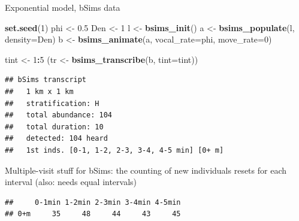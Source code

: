 \documentclass[12pt,]{book}
\newenvironment{Shaded}{\begin{snugshade}}{\end{snugshade}}
\newcommand{\DataTypeTok}[1]{\textcolor[rgb]{0.13,0.29,0.53}{#1}}
\newcommand{\DecValTok}[1]{\textcolor[rgb]{0.00,0.00,0.81}{#1}}
\newcommand{\FloatTok}[1]{\textcolor[rgb]{0.00,0.00,0.81}{#1}}
\newcommand{\KeywordTok}[1]{\textcolor[rgb]{0.13,0.29,0.53}{\textbf{#1}}}
\newcommand{\NormalTok}[1]{#1}
\newcommand{\OperatorTok}[1]{\textcolor[rgb]{0.81,0.36,0.00}{\textbf{#1}}}
\newcommand{\StringTok}[1]{\textcolor[rgb]{0.31,0.60,0.02}{#1}}
\begin{document}
Exponential model, bSims data

\begin{Shaded}
\begin{Highlighting}[]
\KeywordTok{set.seed}\NormalTok{(}\DecValTok{1}\NormalTok{)}
\NormalTok{phi <-}\StringTok{ }\FloatTok{0.5}
\NormalTok{Den <-}\StringTok{ }\DecValTok{1}
\NormalTok{l <-}\StringTok{ }\KeywordTok{bsims_init}\NormalTok{()}
\NormalTok{a <-}\StringTok{ }\KeywordTok{bsims_populate}\NormalTok{(l, }\DataTypeTok{density=}\NormalTok{Den)}
\NormalTok{b <-}\StringTok{ }\KeywordTok{bsims_animate}\NormalTok{(a, }\DataTypeTok{vocal_rate=}\NormalTok{phi, }\DataTypeTok{move_rate=}\DecValTok{0}\NormalTok{)}

\NormalTok{tint <-}\StringTok{ }\DecValTok{1}\OperatorTok{:}\DecValTok{5}
\NormalTok{(tr <-}\StringTok{ }\KeywordTok{bsims_transcribe}\NormalTok{(b, }\DataTypeTok{tint=}\NormalTok{tint))}
\end{Highlighting}
\end{Shaded}

\begin{verbatim}
## bSims transcript
##   1 km x 1 km
##   stratification: H
##   total abundance: 104
##   total duration: 10
##   detected: 104 heard
##   1st inds. [0-1, 1-2, 2-3, 3-4, 4-5 min] [0+ m]
\end{verbatim}

Multiple-visit stuff for bSims: the counting of new individuals
resets for each interval (also: needs equal intervals)

\begin{Shaded}
\end{Shaded}

\begin{verbatim}
##     0-1min 1-2min 2-3min 3-4min 4-5min
## 0+m     35     48     44     43     45
\end{verbatim}
\end{document}
